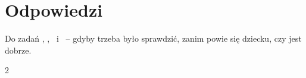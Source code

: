 \section*{Odpowiedzi}

Do zadań \lblAdivina, \lblUne, \lblEncuentra\ i \lblSiNo\ -- gdyby
trzeba było sprawdzić, zanim powie się dziecku, czy jest dobrze.

\begin{multicols}{2}
\footnotesize
\raggedright
\begin{itemize}[leftmargin=0mm, label={}, itemsep=2mm, topsep=0mm]

\end{itemize}
\end{multicols}
\newpage
